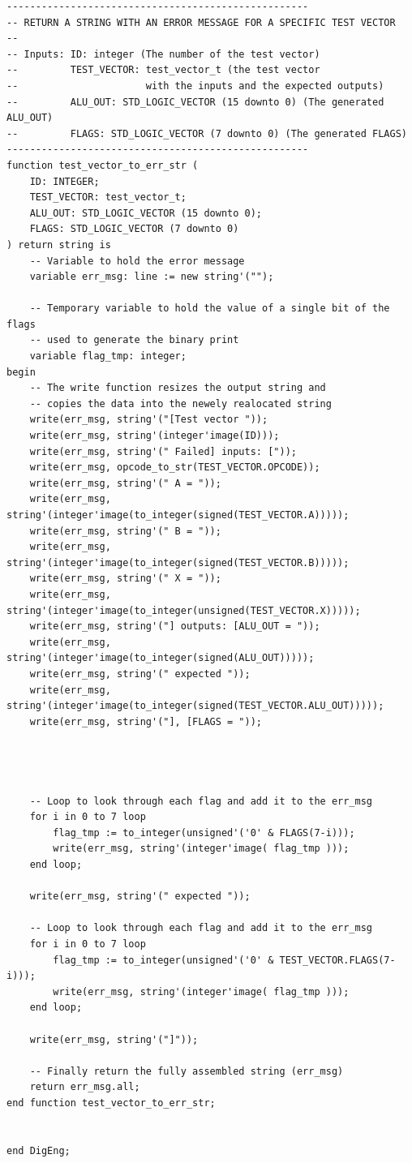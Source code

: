 \documentclass[10pt]{article}
\begin{document}
\begin{verbatim}
----------------------------------------------------
-- RETURN A STRING WITH AN ERROR MESSAGE FOR A SPECIFIC TEST VECTOR
--
-- Inputs: ID: integer (The number of the test vector)
--         TEST_VECTOR: test_vector_t (the test vector 
--                      with the inputs and the expected outputs)
--         ALU_OUT: STD_LOGIC_VECTOR (15 downto 0) (The generated ALU_OUT)
--         FLAGS: STD_LOGIC_VECTOR (7 downto 0) (The generated FLAGS)
----------------------------------------------------
function test_vector_to_err_str (
    ID: INTEGER;
    TEST_VECTOR: test_vector_t;
    ALU_OUT: STD_LOGIC_VECTOR (15 downto 0);
    FLAGS: STD_LOGIC_VECTOR (7 downto 0)
) return string is
    -- Variable to hold the error message
    variable err_msg: line := new string'("");
    
    -- Temporary variable to hold the value of a single bit of the flags
    -- used to generate the binary print
    variable flag_tmp: integer;
begin
    -- The write function resizes the output string and 
    -- copies the data into the newely realocated string
    write(err_msg, string'("[Test vector "));
    write(err_msg, string'(integer'image(ID)));
    write(err_msg, string'(" Failed] inputs: ["));
    write(err_msg, opcode_to_str(TEST_VECTOR.OPCODE));
    write(err_msg, string'(" A = "));
    write(err_msg, string'(integer'image(to_integer(signed(TEST_VECTOR.A)))));
    write(err_msg, string'(" B = "));
    write(err_msg, string'(integer'image(to_integer(signed(TEST_VECTOR.B)))));
    write(err_msg, string'(" X = "));
    write(err_msg, string'(integer'image(to_integer(unsigned(TEST_VECTOR.X)))));
    write(err_msg, string'("] outputs: [ALU_OUT = "));
    write(err_msg, string'(integer'image(to_integer(signed(ALU_OUT)))));
    write(err_msg, string'(" expected "));
    write(err_msg, string'(integer'image(to_integer(signed(TEST_VECTOR.ALU_OUT)))));
    write(err_msg, string'("], [FLAGS = "));
    
    
    
    
    -- Loop to look through each flag and add it to the err_msg
    for i in 0 to 7 loop
        flag_tmp := to_integer(unsigned'('0' & FLAGS(7-i)));
        write(err_msg, string'(integer'image( flag_tmp )));
    end loop;
    
    write(err_msg, string'(" expected "));
    
    -- Loop to look through each flag and add it to the err_msg
    for i in 0 to 7 loop
        flag_tmp := to_integer(unsigned'('0' & TEST_VECTOR.FLAGS(7-i)));
        write(err_msg, string'(integer'image( flag_tmp )));
    end loop;
    
    write(err_msg, string'("]"));
    
    -- Finally return the fully assembled string (err_msg)
    return err_msg.all;
end function test_vector_to_err_str;


end DigEng;
\end{verbatim}
\newpage
\end{document}
